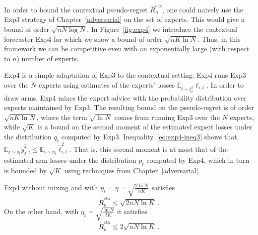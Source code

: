 \documentclass[11pt]{hackednow}
\newcommand{\E}{\mathbb{E}}
\newcommand{\oR}{\overline{R}}
\renewcommand{\tilde}{\widetilde}
\newcommand{\oRx}{\oR^{\mathrm{ctx}}}
\begin{document}
In order to bound the contextual pseudo-regret $\oRx_n$, one could naively use the Exp3 strategy of Chapter~\ref{adversarial} on the set of experts. This would give a bound of order $\sqrt{n N \log N}$. In Figure~\ref{fig:exp4} we introduce the contextual forecaster Exp4 for which we show a bound of order $\sqrt{n K \ln N}$. Thus, in this framework we can be competitive even with an exponentially large (with respect to $n$) number of experts.

Exp4 is a simple adaptation of Exp3 to the contextual setting. Exp4 runs Exp3 over the $N$ experts using estimates of the experts' losses $\E_{i \sim \xi_t^j} \ell_{i,t}$. In order to draw arms, Exp4 mixes the expert advice with the probability distribution over experts maintained by Exp3. The resulting bound on the pseudo-regret is of order $\sqrt{nK\ln N}$, where the term $\sqrt{\ln N}$ comes from running Exp3 over the $N$ experts, while $\sqrt{K}$ is a bound on the second moment of the estimated expert losses under the distribution $q_t$ computed by Exp3. Inequality~\eqref{eq:exp4-ineq3} shows that $\E_{j \sim q_t} \tilde{y}^2_{j,t} \le \E_{i \sim p_t} \tilde{\ell}_{i,t}^2$. That is, this second moment is at most that of the estimated arm losses under the distribution $p_t$ computed by Exp4, which in turn is bounded by $\sqrt{K}$ using techniques from Chapter~\ref{adversarial}.
\begin{theorem}
\label{th:Exp4}
Exp4 without mixing and with $\eta_t=\eta = \sqrt{\frac{2 \ln N}{n K}}$ satisfies
\begin{equation} \label{eq:exp4bound}
	\oRx_n \leq \sqrt{2 n N \ln K}~.
\end{equation}
On the other hand, with $\eta_t = \sqrt{\frac{\ln N}{t K}}$ it satisfies
\begin{equation} \label{eq:exp4boundanytime}
	\oRx_n \leq 2 \sqrt{n N \ln K}~.
\end{equation}
\end{theorem}
\end{document}
